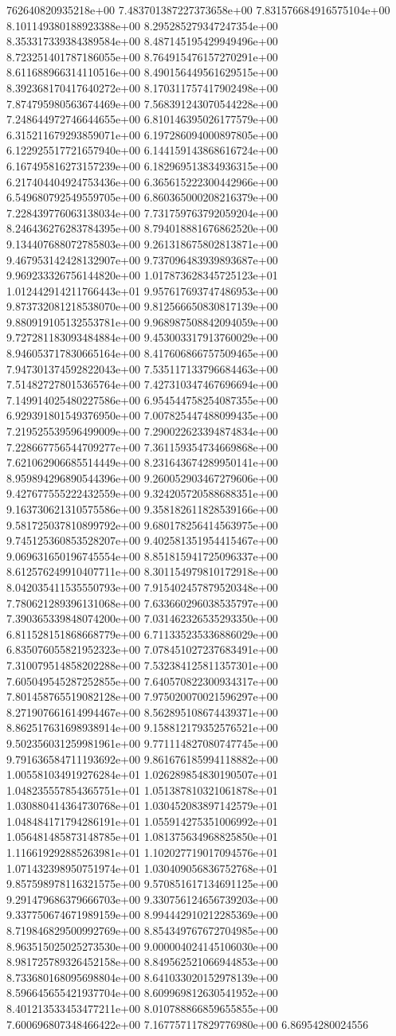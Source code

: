 762640820935218e+00	7.483701387227373658e+00	7.831576684916575104e+00	8.101149380188923388e+00	8.295285279347247354e+00	8.353317339384389584e+00	8.487145195429949496e+00	8.723251401787186055e+00	8.764915476157270291e+00	8.611688966314110516e+00	8.490156449561629515e+00	8.392368170417640272e+00	8.170311757417902498e+00	7.874795980563674469e+00	7.568391243070544228e+00	7.248644972746644655e+00	6.810146395026177579e+00	6.315211679293859071e+00	6.197286094000897805e+00	6.122925517721657940e+00	6.144159143868616724e+00	6.167495816273157239e+00	6.182969513834936315e+00	6.217404404924753436e+00	6.365615222300442966e+00	6.549680792549559705e+00	6.860365000208216379e+00	7.228439776063138034e+00	7.731759763792059204e+00	8.246436276283784395e+00	8.794018881676862520e+00	9.134407688072785803e+00	9.261318675802813871e+00	9.467953142428132907e+00	9.737096483939893687e+00	9.969233326756144820e+00	1.017873628345725123e+01	1.012442914211766443e+01	9.957617693747486953e+00	9.873732081218538070e+00	9.812566650830817139e+00	9.880919105132553781e+00	9.968987508842094059e+00	9.727281183093484884e+00	9.453003317913760029e+00	8.946053717830665164e+00	8.417606866757509465e+00	7.947301374592822043e+00	7.535117133796684463e+00	7.514827278015365764e+00	7.427310347467696694e+00	7.149914025480227586e+00	6.954544758254087355e+00	6.929391801549376950e+00	7.007825447488099435e+00	7.219525539596499009e+00	7.290022623394874834e+00	7.228667756544709277e+00	7.361159354734669868e+00	7.621062906685514449e+00	8.231643674289950141e+00	8.959894296890544396e+00	9.260052903467279606e+00	9.427677555222432559e+00	9.324205720588688351e+00	9.163730621310575586e+00	9.358182611828539166e+00	9.581725037810899792e+00	9.680178256414563975e+00	9.745125360853528207e+00	9.402581351954415467e+00	9.069631650196745554e+00	8.851815941725096337e+00	8.612576249910407711e+00	8.301154979810172918e+00	8.042035411535550793e+00	7.915402457879520348e+00	7.780621289396131068e+00	7.633660296038535797e+00	7.390365339848074200e+00	7.031462326535293350e+00	6.811528151868668779e+00	6.711335235336886029e+00	6.835076055821952323e+00	7.078451027237683491e+00	7.310079514858202288e+00	7.532384125811357301e+00	7.605049545287252855e+00	7.640570822300934317e+00	7.801458765519082128e+00	7.975020070021596297e+00	8.271907661614994467e+00	8.562895108674439371e+00	8.862517631698938914e+00	9.158812179352576521e+00	9.502356031259981961e+00	9.771114827080747745e+00	9.791636584711193692e+00	9.861676185994118882e+00	1.005581034919276284e+01	1.026289854830190507e+01	1.048235557854365751e+01	1.051387810321061878e+01	1.030880414364730768e+01	1.030452083897142579e+01	1.048484171794286191e+01	1.055914275351006992e+01	1.056481485873148785e+01	1.081375634968825850e+01	1.116619292885263981e+01	1.102027719017094576e+01	1.071432398950751974e+01	1.030409056836752768e+01	9.857598978116321575e+00	9.570851617134691125e+00	9.291479686379666703e+00	9.330756124656739203e+00	9.337750674671989159e+00	8.994442910212285369e+00	8.719846829500992769e+00	8.854349767672704985e+00	8.963515025025273530e+00	9.000004024145106030e+00	8.981725789326452158e+00	8.849562521066944853e+00	8.733680168095698804e+00	8.641033020152978139e+00	8.596645655421937704e+00	8.609969812630541952e+00	8.401213533453477211e+00	8.010788866859655855e+00	7.600696807348466422e+00	7.167757117829776980e+00	6.86954280024556